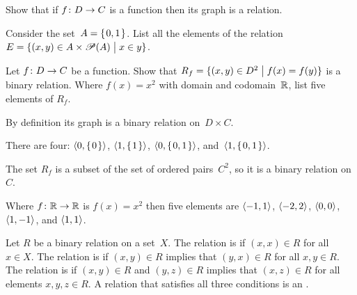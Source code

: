 \documentclass{test}  %
\begin{document}
\begin{ex}
\begin{exes}
\item Show that if $\mbox{$f\colon D\to C$}$ is a function then 
  its graph is a relation.
\item
  Consider the set~$A=\mbox{$\{\hspace{0.1em}0,1\hspace{0.1em}\}$}$.
  List all the elements of the relation 
  $E=\{(x,y)\in A\times\mathscr{P}(A) \bigm| x\in y\}$.
\item Let $\mbox{$f\colon D\to C$}$ be a function.
  Show that 
  $R_f=\{(x,y)\in D^2 \bigm| f(x)=f(y)\}$
  is a binary relation.
  Where $f(x)=x^2$ with domain and codomain~$\mathbb{R}$,
  list five elements of $R_f$. 
\end{exes}
\begin{ans}
\begin{exes}
\item By definition its graph is a binary relation on~$D\times C$.
\item There are four: $\langle0,\mbox{$\{\hspace{0.1em}0\hspace{0.1em}\}$}\rangle$, 
  $\langle1,\mbox{$\{\hspace{0.1em}1\hspace{0.1em}\}$}\rangle$, $\langle0,\mbox{$\{\hspace{0.1em}0,1\hspace{0.1em}\}$}\rangle$, 
  and~$\langle1,\mbox{$\{\hspace{0.1em}0,1\hspace{0.1em}\}$}\rangle$. 
\item The set $R_f$ is a subset of the set of ordered pairs~$C^2$,
  so it is a binary relation on~$C$.

  Where $\mbox{$f\colon \mathbb{R}\to \mathbb{R}$}$ is $f(x)=x^2$ then five elements are
  $\langle-1,1\rangle$, $\langle-2,2\rangle$, $\langle0,0\rangle$,
  $\langle1,-1\rangle$, and $\langle1,1\rangle$.
\end{exes}
\end{ans}
\end{ex}

\begin{df} 
Let $R$ be a binary relation on a set~$X$.
The relation is  if $(x,x)\in R$ for all $x\in X$.
The relation is  if $(x,y)\in R$ implies that
$(y,x)\in R$ for all $x,y\in R$.
The relation is  if 
$(x,y)\in R$ and $(y,z)\in R$ implies that 
$(x,z)\in R$ for all elements $x,y,z\in R$.
A relation that satisfies all three conditions is an
.  
\end{df}
\end{document}
